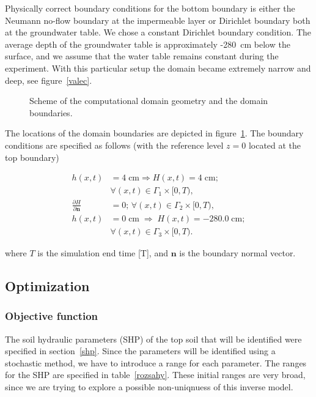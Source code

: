 \documentclass[review,times,3p,twocolumn,10pt]{elsarticle}
\newenvironment{lineq}
    {\begin{linenomath*}
    \begin{equation}
    }
    { 
    \end{equation} 
    \end{linenomath*}
    }
\renewcommand{\vec}{\mathbf}
\begin{document}
Physically correct boundary conditions for the bottom boundary is either the Neumann no-flow boundary at the impermeable layer or Dirichlet boundary both at the groundwater table. We chose a constant Dirichlet boundary condition. The average depth of the groundwater table is approximately -280~cm below the surface, and  we assume that the water table remains constant during the experiment. With this particular setup the domain became extremely narrow and deep, see figure~\ref{valec}.


 \begin{figure}
\centering
{}
 \caption{Scheme of the computational domain geometry and the domain boundaries.}
 \label{valecbc}
\end{figure}


The locations of the domain boundaries are depicted in figure~\ref{valecbc}. The boundary conditions are specified as follows (with the reference level $z=0$ located at the top boundary)
\begin{lineq} 
\begin{split}
h(x,t) &= 4 \; \mbox{cm} \Rightarrow H(x,t) = 4 \; \mbox{cm}; \\ &\forall (x,t) \in \Gamma_1 \times [0,T), \\
\frac{\partial H}{\partial \vec{n}} &= 0; \, \forall (x,t) \in \Gamma_2 \times [0,T), \\
h(x,t) &= 0  \; \mbox{cm}  \; \Rightarrow \; H(x,t) = -280.0  \; \mbox{cm}; \\ &\forall (x,t) \in \Gamma_3 \times [0,T).
\end{split}
\end{lineq}
where $T$ is the simulation end time [T], and $\vec{n}$ is the boundary normal vector.




\subsection{Optimization}

\subsubsection{Objective function} %
\label{objdef}

The soil hydraulic parameters (SHP) of the top soil that will be identified were specified in section~\ref{shp}.
Since the parameters will be identified using a stochastic method, we have to introduce a  range for each parameter. The ranges for the SHP are specified in table~\ref{rozsahy}. These initial ranges are very broad, since we are trying to explore a possible non-uniqnuess of this inverse model.
\end{document}
